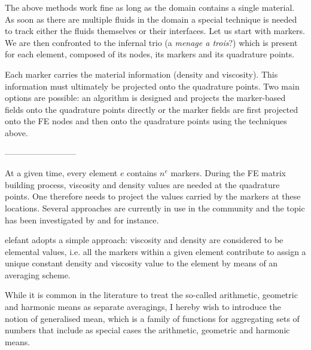 The above methods work fine as long as the domain contains a single material. As soon as there are multiple fluids in the domain a special technique is needed to track either the fluids themselves or their interfaces. 
Let us start with markers. We are then confronted to the infernal trio (a {\it menage a trois}?)
which is present for each element, composed of its nodes, its markers and its quadrature points. 

Each marker carries the material information (density and viscosity). 
This information must ultimately be projected onto the quadrature points. Two main options are possible: an algorithm is designed and projects the marker-based fields onto the quadrature points directly or the marker fields are first projected onto the FE nodes and then onto the quadrature points using the techniques above.  

--------------------------




At a given time, every element $e$ contains $n^e$ markers. During the FE matrix building 
process, viscosity and density values are needed at the quadrature points. 
One therefore needs to project the values carried by the markers at these locations. 
Several approaches are currently in use in the community and the topic has been 
investigated 
by \cite{deka08} and \cite{dumg11} for instance.

{\sc elefant} adopts a simple approach: viscosity and density are considered to be elemental values, i.e. 
all the markers within a given element contribute to assign a unique constant density and viscosity 
value to the element by means of an averaging scheme. 

While it is common in the literature to treat the so-called arithmetic, geometric and harmonic means 
as separate averagings, I hereby wish to introduce the notion of generalised mean, which is a family 
of functions for aggregating sets of numbers that include as special cases the arithmetic, geometric and 
harmonic means. 

